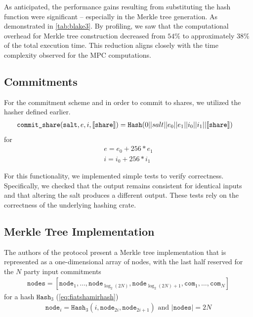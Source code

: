 \documentclass[11pt]{report}
\theoremstyle{definition}
\theoremstyle{plain}
\begin{document}
As anticipated, the performance gains resulting from substituting the hash function were significant -- especially in the Merkle tree generation. As demonstrated in \autoref{tab:blake3}. By profiling, we saw that the computational overhead for Merkle tree construction decreased from $54\%$ to approximately $38\%$ of the total execution time. This reduction aligns closely with the time complexity observed for the MPC computations.

\subsection{Commitments}

For the commitment scheme and in order to commit to shares, we utilized the hasher defined earlier.
\begin{align*}
   & \texttt{commit\_share}(\texttt{salt}, e, i, \llbracket \texttt{share} \rrbracket) = \texttt{Hash}(0 || salt || e_0 || e_1 || i_0 || i_1 || \llbracket \texttt{share} \rrbracket)
\end{align*}
for
\begin{align*}
  e = e_0 + 256 * e_1 \\
  i = i_0 + 256 * i_1
\end{align*}

For this functionality, we implemented simple tests to verify correctness. Specifically, we checked that the output remains consistent for identical inputs and that altering the salt produces a different output. These tests rely on the correctness of the underlying hashing crate.

\subsection{Merkle Tree Implementation}\label{sub:merkle_tree_impl}

The authors of the protocol present a Merkle tree implementation that is represented as a one-dimensional array of nodes, with the last half reserved for the $N$ party input commitments
\begin{align*}
  \texttt{nodes} = [\texttt{node}_1, \dots, \texttt{node}_{\log_2(2N)}, \texttt{node}_{\log_2(2N)+1}, \texttt{com}_1, \dots, \texttt{com}_N]
\end{align*}
for a hash $\texttt{Hash}_3$ (\autoref{eq:fiatshamirhash})
\begin{align*}
  \texttt{node}_i = \texttt{Hash}_3(i, \texttt{node}_{2i}, \texttt{node}_{2i + 1})\text{ and } |\texttt{nodes}| = 2N
\end{align*}
\end{document}
